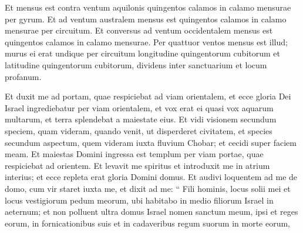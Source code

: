 \begin{biblechapter}
\begin{biblechapter}
\begin{biblechapter}
\begin{biblechapter}
\begin{biblechapter}
\begin{biblechapter}
\begin{biblechapter}
\begin{biblechapter}
\begin{biblechapter}
\begin{biblechapter}
\begin{biblechapter}
\begin{biblechapter}
\begin{biblechapter}
\begin{biblechapter}
\begin{biblechapter}
\begin{biblechapter}
\begin{biblechapter}
\begin{biblechapter}
\begin{biblechapter}
\begin{biblechapter}
\begin{biblechapter}
\begin{biblechapter}
\begin{biblechapter}
\begin{biblechapter}
\begin{biblechapter}
\begin{biblechapter}
\begin{biblechapter}
\begin{biblechapter}
\begin{biblechapter}
\begin{biblechapter}
\begin{biblechapter}
\begin{biblechapter}
\begin{biblechapter}
\begin{biblechapter}
\begin{biblechapter}
\begin{biblechapter}
\begin{biblechapter}
\begin{biblechapter}
\begin{biblechapter}
\begin{biblechapter}
\begin{biblechapter}
\begin{biblechapter}
\verse Et mensus est contra ventum aquilonis quingentos calamos in calamo mensurae per gyrum. 
\verse Et ad ventum australem mensus est quingentos calamos in calamo mensurae per circuitum. 
\verse Et conversus ad ventum occidentalem mensus est quingentos calamos in calamo mensurae. 
\verse Per quattuor ventos mensus est illud; murus ei erat undique per circuitum longitudine quingentorum cubitorum et latitudine quingentorum cubitorum, dividens inter sanctuarium et locum profanum.
 
\begin{biblechapter}
\verse Et duxit me ad portam, quae respiciebat ad viam orientalem, 
\verse et ecce gloria Dei Israel ingrediebatur per viam orientalem, et vox erat ei quasi vox aquarum multarum, et terra splendebat a maiestate eius. 
\verse Et vidi visionem secundum speciem, quam videram, quando venit, ut disperderet civitatem, et species secundum aspectum, quem videram iuxta fluvium Chobar; et cecidi super faciem meam.
 \verse Et maiestas Domini ingressa est templum per viam portae, quae respiciebat ad orientem. 
\verse Et levavit me spiritus et introduxit me in atrium interius; et ecce repleta erat gloria Domini domus. 
\verse Et audivi loquentem ad me de domo, cum vir staret iuxta me, 
\verse et dixit ad me: “ Fili hominis, locus solii mei et locus vestigiorum pedum meorum, ubi habitabo in medio filiorum Israel in aeternum; et non polluent ultra domus Israel nomen sanctum meum, ipsi et reges eorum, in fornicationibus suis et in cadaveribus regum suorum in morte eorum, 

\end{biblechapter}
\end{biblechapter}
\end{biblechapter}
\end{biblechapter}
\end{biblechapter}
\end{biblechapter}
\end{biblechapter}
\end{biblechapter}
\end{biblechapter}
\end{biblechapter}
\end{biblechapter}
\end{biblechapter}
\end{biblechapter}
\end{biblechapter}
\end{biblechapter}
\end{biblechapter}
\end{biblechapter}
\end{biblechapter}
\end{biblechapter}
\end{biblechapter}
\end{biblechapter}
\end{biblechapter}
\end{biblechapter}
\end{biblechapter}
\end{biblechapter}
\end{biblechapter}
\end{biblechapter}
\end{biblechapter}
\end{biblechapter}
\end{biblechapter}
\end{biblechapter}
\end{biblechapter}
\end{biblechapter}
\end{biblechapter}
\end{biblechapter}
\end{biblechapter}
\end{biblechapter}
\end{biblechapter}
\end{biblechapter}
\end{biblechapter}
\end{biblechapter}
\end{biblechapter}
\end{biblechapter}
